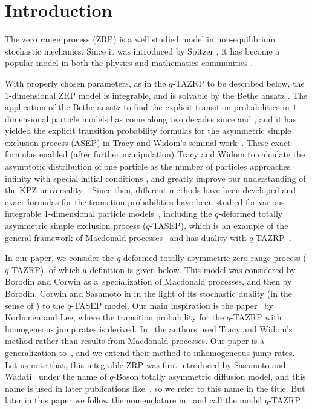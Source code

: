 \documentclass[pdftex]{sigma}
\numberwithin{equation}{section}
\begin{document}
\renewcommand{\thefootnote}{\arabic{footnote}}
\setcounter{footnote}{0}

\section{Introduction}

The zero range process (ZRP) is a well studied model in non-equilibrium stochastic mechanics. Since it was introduced by Spitzer \cite{Spitzer70}, it has become a popular model in both the physics and mathematics communities \cite{Balazs-Komjathy08}.

With properly chosen parameters, as in the $q$-TAZRP to be described below, the $1$-di\-men\-sio\-nal ZRP model is integrable, and is solvable by the Bethe ansatz \cite{Borodin-Corwin-Sasamoto14,Povolotsky13, Sasamoto-Wadati98}. The application of the Bethe ansatz to f\/ind the explicit transition pro\-ba\-bilities in $1$-dimensional particle models has come along two decades since \cite{Gwa-Spohn92} and \cite{Schutz97}, and it has yielded the explicit transition probability formulas for the asymmetric simple exclusion process (ASEP) in Tracy and Widom's seminal work~\cite{Tracy-Widom08}. These exact formulas enabled (after further manipulation) Tracy and Widom to calculate the asymptotic distribution of one particle as the number of particles approaches inf\/inity with special initial conditions \cite{Tracy-Widom09}, and greatly improve our understanding of the KPZ universality~\cite{Corwin11,Quastel12}. Since then, dif\/ferent methods have been developed and exact formulas for the transition probabilities have been studied for various integrable $1$-dimensional particle models~\cite{Lee11}, including the $q$-deformed totally asymmetric simple exclusion process ($q$-TASEP), which is an example of the general framework of Macdonald processes~\cite{Borodin-Corwin13} and has duality with $q$-TAZRP~\cite{Borodin-Corwin-Sasamoto14}.

In our paper, we consider the $q$-deformed totally asymmetric zero range process ($q$-TAZRP), of which a def\/inition is given below. This model was considered by Borodin and Corwin as a~specialization of Macdonald processes, and then by Borodin, Corwin and Sasamoto in \cite{Borodin-Corwin-Sasamoto14} in the light of its stochastic duality (in the sense of \cite[Section~2.3]{Liggett05}) to the $q$-TASEP model. Our main inspiration is the paper~\cite{Korhonen-Lee14} by Korhonen and Lee, where the transition probability for the $q$-TAZRP with homogeneous jump rates is derived. In~\cite{Korhonen-Lee14} the authors used Tracy and Widom's method rather than results from Macdonald processes. Our paper is a generalization to~\cite{Korhonen-Lee14}, and we extend their method to inhomogeneous jump rates. Let us note that, this integrable ZRP was f\/irst introduced by Sasamoto and Wadati~\cite{Sasamoto-Wadati98} under the name of $q$-Boson totally asymmetric dif\/fusion model, and this name is used in later publications like~\cite{Borodin-Corwin-Petrov-Sasamoto15}, so we refer to this name in the title. But later in this paper we follow the nomenclature in~\cite{Korhonen-Lee14} and call the model $q$-TAZRP.
\end{document}
